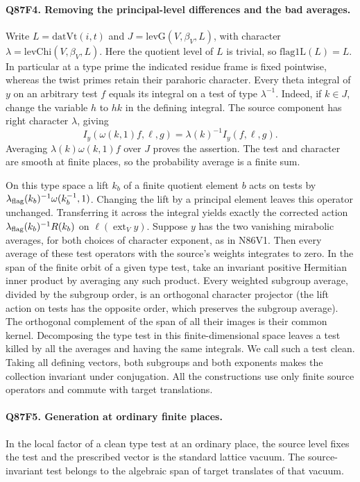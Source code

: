 \paragraph{Q87F4. Removing the principal-level differences and the bad averages.}
Write $L=\mathrm{datVt}(i,t)$ and
$J=\mathrm{levG}(V,\beta_V,L)$, with character
$\lambda=\mathrm{levChi}(V,\beta_V,L)$. Here the quotient level
of $L$ is trivial, so $\mathrm{flag1L}(L)=L$. In particular at a
type prime the indicated residue frame is fixed pointwise, whereas
the twist primes retain their parahoric character. Every theta integral of $y$ on an arbitrary test $f$
equals its integral on a test of type $\lambda^{-1}$.
Indeed, if $k\in J$, change the variable $h$ to $hk$ in the
defining integral. The source component has right character
$\lambda$, giving
\[
 I_y(\omega(k,1)f,\ell,g)=\lambda(k)^{-1}I_y(f,\ell,g).
\]
Averaging $\lambda(k)\omega(k,1)f$ over $J$ proves the assertion.
The test and character are smooth at finite places, so the
probability average is a finite sum.

On this type space a lift $k_b$ of a finite quotient element $b$
acts on tests by
$\lambda_{\rm flag}(k_b)^{-1}\omega(k_b^{-1},1)$.
Changing the lift by a principal element leaves this operator
unchanged. Transferring it across the integral yields exactly the
corrected action $\lambda_{\rm flag}(k_b)^{-1}R(k_b)$ on
$\ell(\operatorname{ext}_V y)$. Suppose $y$ has the two vanishing
mirabolic averages, for both choices of character exponent, as in
N86V1. Then every average of these test operators with the source's
weights integrates to zero. In the span of the finite orbit of a
given type test, take an invariant positive Hermitian inner product
by averaging any such product. Every weighted subgroup average,
divided by the subgroup order, is an orthogonal character projector
(the lift action on tests has the opposite order, which preserves
the subgroup average). The orthogonal complement of the span of
all their images is their common kernel. Decomposing the type test
in this finite-dimensional space leaves a test killed by all the
averages and having the same integrals. We call such a test clean.
Taking all defining vectors, both subgroups and both exponents makes
the collection invariant under conjugation. All the constructions
use only finite source operators and commute with target translations.

\paragraph{Q87F5. Generation at ordinary finite places.}
In the local factor of a clean type test at an ordinary place,
the source level fixes the test and the prescribed vector is the
standard lattice vacuum. The source-invariant test belongs to
the algebraic span of target translates of that vacuum.

